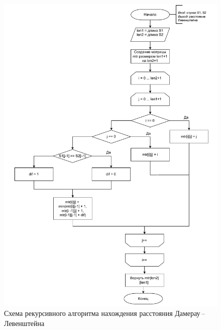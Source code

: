 \begin{figure}[h]
	\centering
	\includegraphics[height=0.9\textheight, page=3]{img/algoritms.pdf}
	\caption{Схема рекурсивного алгоритма нахождения расстояния Дамерау\,--\,Левенштейна}
	\label{fig:DLrec}
\end{figure}

\clearpage

